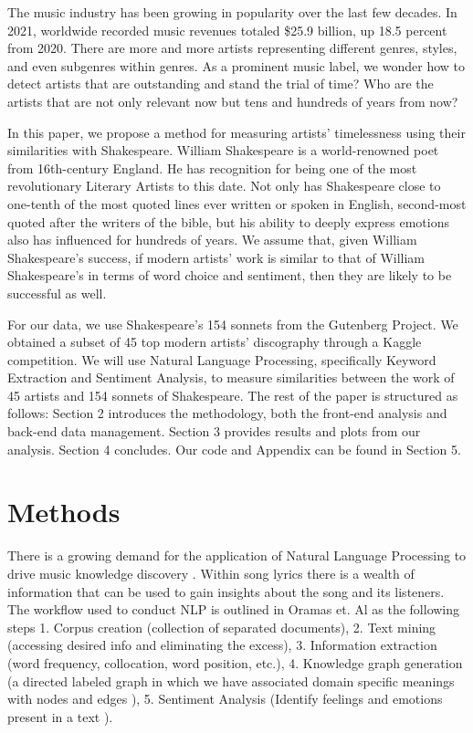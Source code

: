 \documentclass[10pt,a4paper]{article}
\begin{document}
The music industry has been growing in popularity over the last few decades. In 2021, worldwide recorded music revenues totaled \$25.9 billion, up 18.5 percent from 2020. \cite{music-world}There are more and more artists representing different genres, styles, and even subgenres within genres. As a prominent music label, we wonder how to detect artists that are outstanding and stand the trial of time? Who are the artists that are not only relevant now but tens and hundreds of years from now?

\noindent In this paper, we propose a method for measuring artists’ timelessness using their similarities with Shakespeare. William Shakespeare is a world-renowned poet from 16th-century England. He has recognition for being one of the most revolutionary Literary Artists to this date. Not only has Shakespeare close to one-tenth of the most quoted lines ever written or spoken in English, second-most quoted after the writers of the bible, but his ability to deeply express emotions also has influenced for hundreds of years.\cite{shakeFacts} We assume that, given William Shakespeare’s success, if modern artists’ work is similar to that of William Shakespeare’s in terms of word choice and sentiment, then they are likely to be successful as well.

\noindent For our data, we use Shakespeare's 154 sonnets from the Gutenberg Project. \cite{sonnetsData} We obtained a subset of 45 top modern artists’ discography through a Kaggle competition. We will use Natural Language Processing, specifically Keyword Extraction and Sentiment Analysis, to measure similarities between the work of 45 artists and 154 sonnets of Shakespeare. The rest of the paper is structured as follows: Section 2 introduces the methodology, both the front-end analysis and back-end data management. Section 3 provides results and plots from our analysis. Section 4 concludes. Our code and Appendix can be found in Section 5. 

\section{Methods}
There is a growing demand for the application of Natural Language Processing to drive music knowledge discovery \cite{NLP-for-lyrics}. Within song lyrics there is a wealth of information that can be used to gain insights about the song and its listeners. The workflow used to conduct NLP is outlined in Oramas et. Al \cite{NLP-for-music} as the following steps 1. Corpus creation (collection of separated documents), 2. Text mining (accessing desired info and eliminating the excess), 3. Information extraction (word frequency, collocation, word position, etc.), 4. Knowledge graph generation (a directed labeled graph in which we have associated domain specific meanings with nodes and edges \cite{knowledge-graphs}), 5. Sentiment Analysis (Identify feelings and emotions present in a text \cite{monkey}).
 
\end{document}
